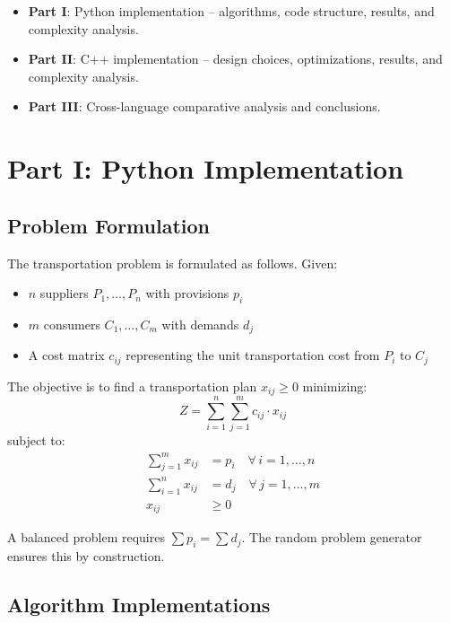 \documentclass[12pt,a4paper]{article}
\begin{document}
\begin{itemize}
  \item \textbf{Part I}: Python implementation -- algorithms, code structure, results, and complexity analysis.
  \item \textbf{Part II}: C++ implementation -- design choices, optimizations, results, and complexity analysis.
  \item \textbf{Part III}: Cross-language comparative analysis and conclusions.
\end{itemize}

\newpage
\section{Part I: Python Implementation}

\subsection{Problem Formulation}

The transportation problem is formulated as follows. Given:
\begin{itemize}
  \item $n$ suppliers $P_1, \ldots, P_n$ with provisions $p_i$
  \item $m$ consumers $C_1, \ldots, C_m$ with demands $d_j$
  \item A cost matrix $c_{ij}$ representing the unit transportation cost from $P_i$ to $C_j$
\end{itemize}

The objective is to find a transportation plan $x_{ij} \geq 0$ minimizing:
\begin{equation}
  Z = \sum_{i=1}^{n} \sum_{j=1}^{m} c_{ij} \cdot x_{ij}
\end{equation}
subject to:
\begin{align}
  \sum_{j=1}^{m} x_{ij} &= p_i \quad \forall\, i = 1, \ldots, n \\
  \sum_{i=1}^{n} x_{ij} &= d_j \quad \forall\, j = 1, \ldots, m \\
  x_{ij} &\geq 0
\end{align}

A balanced problem requires $\sum p_i = \sum d_j$. The random problem generator ensures this by construction.

\subsection{Algorithm Implementations}
\end{document}
